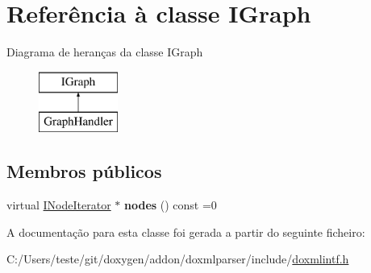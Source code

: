 \hypertarget{class_i_graph}{\section{Referência à classe I\-Graph}
\label{class_i_graph}
}
Diagrama de heranças da classe I\-Graph\begin{figure}[H]
\begin{center}
\leavevmode
\includegraphics[height=2.000000cm]{class_i_graph}
\end{center}
\end{figure}
\subsection*{Membros públicos}
\begin{DoxyCompactItemize}
\item 
\hypertarget{class_i_graph_ac69427e84eb41c4eedeb0add8dbba5e0}{virtual \hyperlink{class_i_node_iterator}{I\-Node\-Iterator} $\ast$ {\bfseries nodes} () const =0}\label{class_i_graph_ac69427e84eb41c4eedeb0add8dbba5e0}

\end{DoxyCompactItemize}


A documentação para esta classe foi gerada a partir do seguinte ficheiro\-:\begin{DoxyCompactItemize}
\item 
C\-:/\-Users/teste/git/doxygen/addon/doxmlparser/include/\hyperlink{include_2doxmlintf_8h}{doxmlintf.\-h}\end{DoxyCompactItemize}

